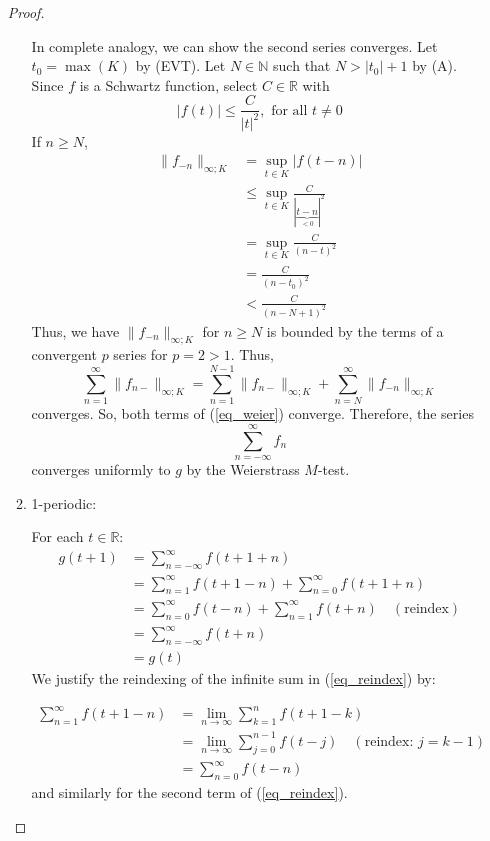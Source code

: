 \documentclass[12pt, reqno]{article}
\theoremstyle{definition}
\theoremstyle{remark}
\begin{document}
\begin{itemize}
\begin{proof}
\begin{enumerate}
            In complete analogy, we can show the second series converges. Let $t_{0}=\max(K)$ by (EVT). Let $N\in \mathbb{N}$ such that $N>|t_{0}|+1$ by (A). Since $f$ is a Schwartz function, select $C\in \mathbb{R}$ with $$
            |f(t)|\le \frac{C}{|t|^{2}},\text{ for all }t\ne0
            $$
            If $n\ge N$,
            \begin{align*}
            \|f_{-n}\|_{\infty;K}&= \sup_{t\in K}|f(t-n)|\\
            &\le \sup_{t\in K} \frac{C}{|\underbrace{t-n}_{<0}|^{2}} \\
            &= \sup_{t\in K} \frac{C}{(n-t)^{2}}\\
            &= \frac{C}{(n-t_{0})^{2}}\\
            &< \frac{C}{(n-N+1)^{2}}
            \end{align*}
            Thus, we have $\|f_{-n}\|_{\infty;K}$ for $n\ge N$ is bounded by the terms of a convergent $p$ series for $p=2>1$. Thus, $$\sum_{n=1}^{\infty}\|f_{n-}\|_{\infty;K}=\sum_{n=1}^{N-1}\|f_{n-}\|_{\infty;K}+\sum_{n=N}^{\infty}\|f_{-n}\|_{\infty;K}$$
            converges. So, both terms of (\ref{eq_weier}) converge. Therefore, the series $$
            \sum_{n=-\infty}^{\infty}f_{n}
            $$
            converges uniformly to $g$ by the Weierstrass $M$-test.
            
            

        \item 1-periodic:

        For each $t\in \mathbb{R}$: 
        \begin{align}
        g(t+1)&= \sum_{n=-\infty}^{\infty}f(t+1+n)\\
        &= \sum_{n=1}^{\infty}f(t+1-n)+\sum_{n=0}^{\infty}f(t+1+n)\\
        &= \sum_{n=0}^{\infty}f(t-n)+\sum_{n=1}^{\infty}f(t+n)\quad(\text{reindex}) \label{eq_reindex}
        \\
        &= \sum_{n=-\infty}^{\infty}f(t+n)\\
        &= g(t)
        \end{align}
        We justify the reindexing of the infinite sum in (\ref{eq_reindex}) by: 
        
        \begin{align*}
        \sum_{n=1}^{\infty}f(t+1-n)&= \lim_{n \rightarrow \infty}\sum_{k=1}^{n}f(t+1-k)\\
        &= \lim_{n \rightarrow \infty}\sum_{j=0}^{n-1}f(t-j)\quad(\text{reindex: }j=k-1)\\
        &= \sum_{n=0}^{\infty}f(t-n)
        \end{align*}
        and similarly for the second term of (\ref{eq_reindex}). 


\end{enumerate}
\end{proof}
\end{itemize}
\end{document}
